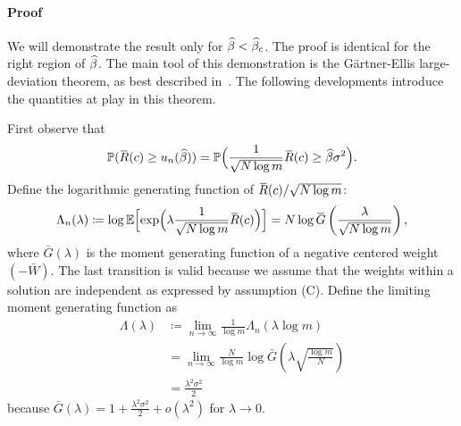 \paragraph{Proof} We will demonstrate the result only for $\widehat{\beta}<\widehat{\beta}_c$.
The proof is identical for the right region of $\widehat{\beta}$.
The main tool of this demonstration is the G\"{a}rtner-Ellis large-deviation
theorem, as best described in~\citep{dembo2009large}. The following developments
introduce the quantities at play in this theorem.

First observe that 
\begin{equation}
  {\mathbb{P}}(\mspace{2mu}\overline{\mspace{-2mu}R\mspace{-2mu}}\mspace{2mu}(c)\geq u_n(\widehat{\beta}))={\mathbb{P}}\Bigl(\frac{1}{\sqrt{N\log m}}\mspace{2mu}\overline{\mspace{-2mu}R\mspace{-2mu}}\mspace{2mu}(c)\geq \widehat{\beta}\sigma^2 \Bigr).
\end{equation}
Define the logarithmic generating function of $\mspace{2mu}\overline{\mspace{-2mu}R\mspace{-2mu}}\mspace{2mu}(c)/\sqrt{N\log m}$:
\begin{equation}
  \Lambda_n(\lambda)\coloneqq\log{\mathbb{E}}\Bigl[\exp\Bigl(\lambda\frac{1}{\sqrt{N\log m}}\mspace{2mu}\overline{\mspace{-2mu}R\mspace{-2mu}}\mspace{2mu}(c)\Bigr)\Bigr]
    = N\log \mspace{2mu}\overline{\mspace{-2mu}G\mspace{-2mu}}\mspace{2mu}\left(\frac{\lambda}{\sqrt{N\log m}}\right),
\end{equation}
%
where $\bar{G}(\lambda)$ is the moment generating function of a negative centered weight $(-\bar{W})$.
The last transition is valid because we assume that the weights within 
a solution are independent as expressed by assumption (C).
Define the limiting moment generating function as
\begin{align}
\Lambda(\lambda)&{\coloneqq} \underset{n\to\infty}{\lim}\frac{1}{\log m}\Lambda_n(\lambda\log m)\\
&= \underset{n\to\infty}{\lim}\frac{N}{\log m}\log\bar{G}\left(\lambda\sqrt{\frac{\log m}{N}}\right)\\
&= \frac{\lambda^2\sigma^2}{2}
\end{align}
because $\bar{G}(\lambda)=1+\frac{\lambda^2\sigma^2}{2}+o(\lambda^2)$ for $\lambda\to 0$.

